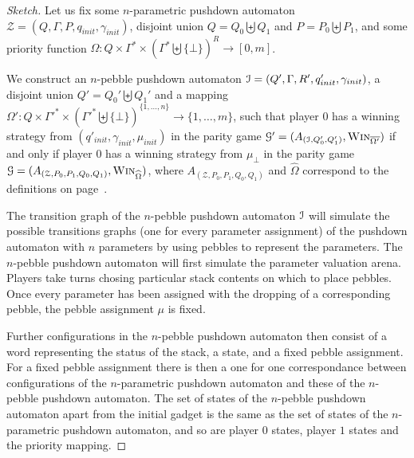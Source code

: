 \documentclass[a4paper,UKenglish,cleveref, autoref, thm-restate]{lipics-v2021}
\newcommand{\win}{\textsc{Win}}
\begin{document}
\begin{proof}[Sketch]


Let us fix some
$n$-parametric pushdown automaton $\mathcal{Z}= (Q, \Gamma, 
P, q_{init}, { \gamma_{init}})$,
 disjoint
union $Q = Q_0  \biguplus Q_1$
and $P = P_0 \biguplus P_1$,
and
some priority function 
$\Omega : Q \times \Gamma^* \times ( \Gamma^* \biguplus \{ \bot \})^R \to [0, m ]$.


We construct
  an 
 $n$-pebble pushdown automaton $\mathcal{I} =(Q', \Gamma,  R', q_{init}', {\gamma_{init}})$,
a 
 disjoint
union $Q' = Q_0'  \biguplus Q_1'$
and a mapping $\Omega' : Q \times  \Gamma'^* \times ( \Gamma'^* \biguplus \{ \bot \})^{\{1, \ldots, n\}} \to \{1, \ldots, m \}$,
such that
player $0$ has a winning strategy from 
$(q'_{init},\gamma_{init}, \mu_{init})$
in
the parity game
$\mathcal{G'}= (A_{(\ppda, Q'_0, Q'_1)}, \win_{\overline{\Omega'}})$
if and only if
player $0$ has a 
winning strategy from $\mu_\bot$ in 
the parity game
$\mathcal{G} =(A_{(\mathcal{Z}, P_0, P_1, Q_0 , Q_1)}, \win_{\widehat{\Omega}})$,
where		 
$A_{(\mathcal{Z}, P_0, P_1, Q_0 , Q_1)}$
and
$\widehat{\Omega}$
correspond to the definitions on page~\pageref{PPDA reachability game}.




The transition graph of the $n$-pebble pushdown automaton $\mathcal{I}$ will simulate the possible transitions graphs 
(one for every 
parameter assignment)
 of the pushdown automaton with $n$ parameters by using pebbles to represent the parameters. 
The $n$-pebble pushdown automaton will first simulate the 
parameter valuation arena.
Players take turns chosing particular stack contents on which to place pebbles. 
Once every parameter has been assigned with the dropping of a corresponding pebble, 
the pebble assignment $\mu$ is fixed.



Further configurations in the $n$-pebble pushdown automaton then consist of a word representing the status of the stack, a state, and a fixed pebble assignment. For a fixed pebble assignment there is then a one for one correspondance between configurations of the $n$-parametric pushdown 
automaton 
and these of the $n$-pebble pushdown automaton. The set of states of the $n$-pebble pushdown automaton apart from the initial gadget is the same as 
the set of states of the $n$-parametric pushdown automaton, and 
so are player $0$ states, player $1$ states and the priority mapping.
\end{proof}
\end{document}
